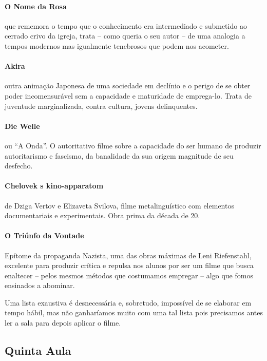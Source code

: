 \documentclass[12pt,a4paper]{article}
\begin{document}
	\paragraph{O Nome da Rosa} que rememora o tempo que 
		o conhecimento era intermediado e submetido ao 
		cerrado crivo da igreja, trata -- como queria 
		o seu autor -- de uma analogia a tempos modernos 
		mas igualmente tenebrosos que podem nos acometer.

	\paragraph{Akira} outra animação Japonesa de uma 
		sociedade em declínio e o perigo de se obter 
		poder incomensurável sem a capacidade e 
		maturidade de emprega-lo. Trata de juventude 
		marginalizada, contra cultura, jovens 
		delinquentes.

	\paragraph{Die Welle} ou ``A Onda''. O autoritativo 
		filme sobre a capacidade do ser humano de 
		produzir autoritarismo e fascismo, da banalidade
		da sua origem magnitude de seu desfecho.

	\paragraph{Chelovek s kino-apparatom} de Dziga Vertov e
		Elizaveta Svilova, filme metalinguístico com 
		elementos documentariais e experimentais. Obra 
		prima da década de 20.

	\paragraph{O Triúnfo da Vontade} Epítome da propaganda 
		Nazista, uma das obras máximas de Leni 
		Riefenstahl, excelente para produzir crítica e 
		repulsa nos alunos por ser um filme que busca 
		enaltecer -- pelos mesmos métodos que costumamos 
		empregar -- algo que fomos ensinados a abominar.
		
	Uma lista exaustiva é desnecessária e, sobretudo, 
	impossível de se elaborar em tempo hábil, mas não 
	ganharíamos muito com uma tal lista pois precisamos
	antes ler a sala para depois aplicar o filme.

	\subsection*{Quinta Aula}
	
\end{document}
